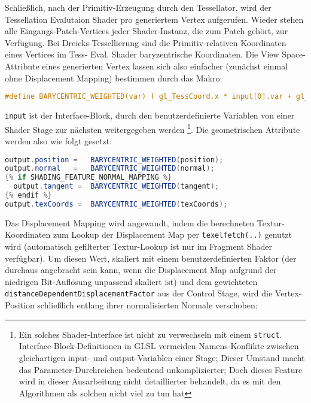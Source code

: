 	Schließlich, nach der Primitiv-Erzeugung durch den Tessellator, wird der Tessellation Evalutaion Shader
	pro generiertem Vertex aufgerufen. Wieder stehen alle Eingangs-Patch-Vertices jeder Shader-Instanz,
	die zum Patch gehört, zur Verfügung.
	Bei Dreicks-Tessellierung sind die Primitiv-relativen Koordinaten eines Vertices im Tess- Eval. Shader
	baryzentrische Koordinaten. Die View Space-Attribute eines generierten Vertex lassen sich also einfacher
	(zunächst einmal ohne Displacement Mapping) bestimmen durch das Makro:
	\begin{lstlisting}[language=GLSL]
	 #define BARYCENTRIC_WEIGHTED(var) ( gl_TessCoord.x * input[0].var + gl_TessCoord.y * input[1].var + gl_TessCoord.z * input[2].var )
	\end{lstlisting}
	\lstinline|input| ist der Interface-Block, durch den benutzerdefinierte Variablen von einer Shader Stage zur nächsten
	weitergegeben werden 
	\footnote{Ein solches Shader-Interface ist nicht zu verwechseln mit einem \lstinline|struct|. 
	Interface-Block-Definitionen in GLSL vermeiden Namens-Konflikte zwischen gleichartigen input- und output-Variablen 
	einer Stage; Dieser Umstand macht das Parameter-Durchreichen bedeutend unkomplizierter; 
	Doch dieses Feature wird in dieser Ausarbeitung nicht detaillierter behandelt, 
	da es mit den Algorithmen als solchen nicht viel zu tun hat}.
	Die geometrischen Attribute werden also wie folgt gesetzt:
	\begin{lstlisting}[language=GLSL]
output.position =   BARYCENTRIC_WEIGHTED(position);
output.normal   =   BARYCENTRIC_WEIGHTED(normal);
{% if SHADING_FEATURE_NORMAL_MAPPING %}
  output.tangent =  BARYCENTRIC_WEIGHTED(tangent);
{% endif %}
output.texCoords =  BARYCENTRIC_WEIGHTED(texCoords);
	\end{lstlisting}
	
	Das Displacement Mapping wird angewandt, indem die berechneten Textur-Koordinaten zum Lookup
	der Displacement Map per \lstinline|texelfetch(..)| genutzt wird (automatisch gefilterter Textur-Lookup ist nur
	im Fragment Shader verfügbar).
	Um diesen Wert, skaliert mit einem benutzerdefinierten Faktor (der durchaus angebracht sein kann, wenn die
	Displacement Map aufgrund der niedrigen Bit-Auflösung unpassend skaliert ist) und dem gewichteten
	\lstinline|distanceDependentDisplacementFactor| aus der Control Stage, wird die Vertex-Position schließlich entlang 
	ihrer normalisierten Normale verschoben:
	

